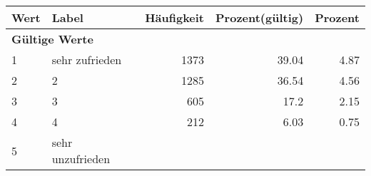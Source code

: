      \begin{longtable}{lXrrr}
     \toprule
     \textbf{Wert} & \textbf{Label} & \textbf{Häufigkeit} & \textbf{Prozent(gültig)} & \textbf{Prozent} \\
     \endhead
     \midrule
     \multicolumn{5}{l}{\textbf{Gültige Werte}}\\

     1 &
     \multicolumn{1}{X}{ sehr zufrieden   } &


       \num{1373} &
       \num[round-mode=places,round-precision=2]{39,04} &
         \num[round-mode=places,round-precision=2]{4,87} \\

     2 &
     \multicolumn{1}{X}{ 2   } &


       \num{1285} &
       \num[round-mode=places,round-precision=2]{36,54} &
         \num[round-mode=places,round-precision=2]{4,56} \\

     3 &
     \multicolumn{1}{X}{ 3   } &


       \num{605} &
       \num[round-mode=places,round-precision=2]{17,2} &
         \num[round-mode=places,round-precision=2]{2,15} \\

     4 &
     \multicolumn{1}{X}{ 4   } &


       \num{212} &
       \num[round-mode=places,round-precision=2]{6,03} &
         \num[round-mode=places,round-precision=2]{0,75} \\

     5 &
     \multicolumn{1}{X}{ sehr unzufrieden   } &



\end{longtable}
